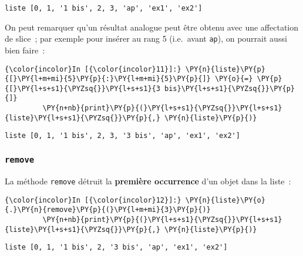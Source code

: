     \begin{Verbatim}[commandchars=\\\{\},frame=single,framerule=0.3mm,rulecolor=\color{cellframecolor}]
liste [0, 1, '1 bis', 2, 3, 'ap', 'ex1', 'ex2']
\end{Verbatim}

    On peut remarquer qu'un résultat analogue peut être obtenu avec une
affectation de slice~; par exemple pour insérer au rang 5 (i.e.~avant
\texttt{ap}), on pourrait aussi bien faire~:

    \begin{Verbatim}[commandchars=\\\{\},frame=single,framerule=0.3mm,rulecolor=\color{cellframecolor}]
{\color{incolor}In [{\color{incolor}11}]:} \PY{n}{liste}\PY{p}{[}\PY{l+m+mi}{5}\PY{p}{:}\PY{l+m+mi}{5}\PY{p}{]} \PY{o}{=} \PY{p}{[}\PY{l+s+s1}{\PYZsq{}}\PY{l+s+s1}{3 bis}\PY{l+s+s1}{\PYZsq{}}\PY{p}{]}
         \PY{n+nb}{print}\PY{p}{(}\PY{l+s+s1}{\PYZsq{}}\PY{l+s+s1}{liste}\PY{l+s+s1}{\PYZsq{}}\PY{p}{,} \PY{n}{liste}\PY{p}{)}
\end{Verbatim}


    \begin{Verbatim}[commandchars=\\\{\},frame=single,framerule=0.3mm,rulecolor=\color{cellframecolor}]
liste [0, 1, '1 bis', 2, 3, '3 bis', 'ap', 'ex1', 'ex2']
\end{Verbatim}

    \hypertarget{remove}{%
\subsubsection{\texorpdfstring{\texttt{remove}}{remove}}\label{remove}}

    La méthode \texttt{remove} détruit la \textbf{première occurrence} d'un
objet dans la liste~:

    \begin{Verbatim}[commandchars=\\\{\},frame=single,framerule=0.3mm,rulecolor=\color{cellframecolor}]
{\color{incolor}In [{\color{incolor}12}]:} \PY{n}{liste}\PY{o}{.}\PY{n}{remove}\PY{p}{(}\PY{l+m+mi}{3}\PY{p}{)}
         \PY{n+nb}{print}\PY{p}{(}\PY{l+s+s1}{\PYZsq{}}\PY{l+s+s1}{liste}\PY{l+s+s1}{\PYZsq{}}\PY{p}{,} \PY{n}{liste}\PY{p}{)}
\end{Verbatim}


    \begin{Verbatim}[commandchars=\\\{\},frame=single,framerule=0.3mm,rulecolor=\color{cellframecolor}]
liste [0, 1, '1 bis', 2, '3 bis', 'ap', 'ex1', 'ex2']
\end{Verbatim}

